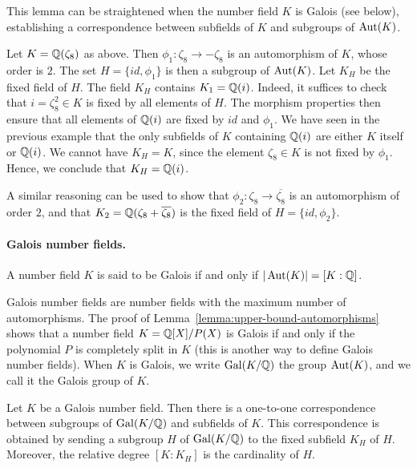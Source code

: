 This lemma can be straightened when the number field $K$ is Galois (see below), establishing a correspondence between subfields of $K$ and subgroups of $\operatorname{Aut}(K)$.

\begin{example}
Let $K = \mathbb{Q}(\zeta_8)$ as above. Then $\phi_1: \zeta_8 \rightarrow -\zeta_8$ is an automorphism of $K$, whose order is $2$. The set $H = \{id, \phi_1\}$ is then a subgroup of $\operatorname{Aut}(K)$. Let $K_H$ be the fixed field of $H$. The field $K_H$ contains $K_1 = \mathbb{Q}(i)$. Indeed, it suffices to check that $i = \zeta_8^2 \in K$ is fixed by all elements of $H$. The morphism properties then ensure that all elements of $\mathbb{Q}(i)$ are fixed by $id$ and $\phi_1$. We have seen in the previous example that the only subfields of $K$ containing $\mathbb{Q}(i)$ are either $K$ itself or $\mathbb{Q}(i)$. We cannot have $K_H = K$, since the element $\zeta_8 \in K$ is not fixed by $\phi_1$. Hence, we conclude that $K_H = \mathbb{Q}(i)$.

A similar reasoning can be used to show that $\phi_2: \zeta_8 \rightarrow \overline{\zeta_8}$ is an automorphism of order $2$, and that $K_2 = \mathbb{Q}(\zeta_8 + \overline{\zeta_8})$ is the fixed field of $H = \{id, \phi_2\}$.
\end{example}

\paragraph{Galois number fields.} 

\begin{definition}
A number field $K$ is said to be Galois if and only if $|\operatorname{Aut}(K)| = [K:\mathbb{Q}]$.
\end{definition}
Galois number fields are number fields with the maximum number of automorphisms. The proof of Lemma~\ref{lemma:upper-bound-automorphisms} shows that a number field $K = \mathbb{Q}[X]/P(X)$ is Galois if and only if the polynomial $P$ is completely split in $K$ (this is another way to define Galois number fields). When $K$ is Galois, we write $\operatorname{Gal}(K/\mathbb{Q})$ the group $\operatorname{Aut}(K)$, and we call it the Galois group of $K$.

\begin{theorem}
\label{thm:Galois-correspondance}
Let $K$ be a Galois number field. Then there is a one-to-one correspondence between subgroups of $\operatorname{Gal}(K/\mathbb{Q})$ and subfields of $K$. This correspondence is obtained by sending a subgroup $H$ of $\operatorname{Gal}(K/\mathbb{Q})$ to the fixed subfield $K_H$ of $H$. Moreover, the relative degree $[K:K_H]$ is the cardinality of $H$.
\end{theorem}

